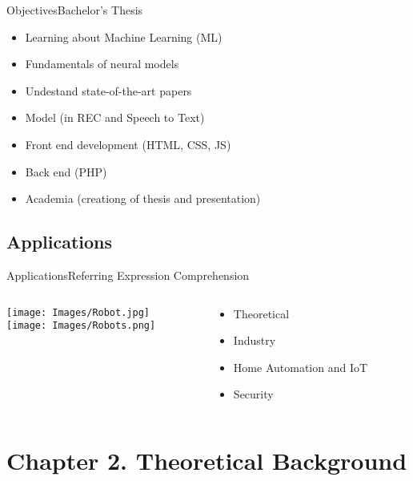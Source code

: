\documentclass{beamer}
\begin{document}
\begin{frame}{Objectives}{Bachelor's Thesis}
  \begin{itemize}
    \item Learning about Machine Learning (ML)
    \item Fundamentals of neural models
    \item Undestand state-of-the-art papers
    \item Model (in REC and Speech to Text)
    \item Front end development (HTML, CSS, JS)
    \item Back end (PHP)
    \item Academia (creationg of thesis and presentation)
  \end{itemize}
\end{frame}


\subsection{Applications}

\begin{frame}{Applications}{Referring Expression Comprehension}
  \begin{columns}
    \begin{column}{.5\textwidth}
      \centering
      \texttt{[image: Images/Robot.jpg]}\\
      \medskip
      \texttt{[image: Images/Robots.png]}
    \end{column}

    \begin{column}{.5\textwidth}
      \begin{itemize}
        \item Theoretical
        \item Industry
        \item Home Automation and IoT
        \item Security
      \end{itemize}
    \end{column}
  \end{columns}
\end{frame}



\section{Chapter 2. Theoretical Background}

\subsection*{}
\end{document}
